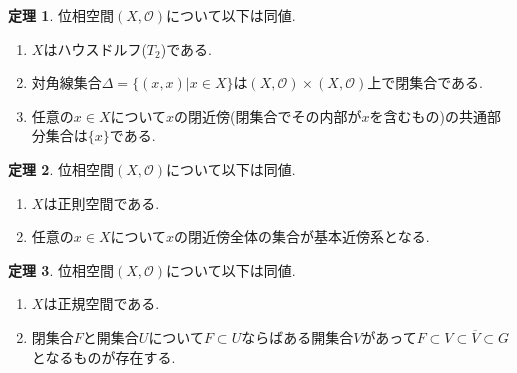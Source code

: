 \documentclass[dvipdfmx,a4paper,11pt]{article}
\theoremstyle{definition}
\newtheorem{thm}{定理}
\begin{document}
    \begin{tcolorbox}[
    colback = white,
    colframe = green!35!black,
    fonttitle = \bfseries,
    breakable = true]
    \begin{thm}
    位相空間$(X, \mathscr{O})$について以下は同値.
    \begin{enumerate}
     \setlength{\parskip}{0cm} 
  \setlength{\itemsep}{0cm} 
    \item $X$はハウスドルフ($T_2$)である.
    \item 対角線集合$\Delta = \{ (x,x) | x \in X\}$は$(X, \mathscr{O}) \times (X, \mathscr{O})$上で閉集合である.
    \item 任意の$x \in X$について$x$の閉近傍(閉集合でその内部が$x$を含むもの)の共通部分集合は$\{ x\}$である.
    \end{enumerate}
  \end{thm}
 \end{tcolorbox}

  \begin{tcolorbox}[
    colback = white,
    colframe = green!35!black,
    fonttitle = \bfseries,
    breakable = true]
    \begin{thm}
    位相空間$(X, \mathscr{O})$について以下は同値.
    \begin{enumerate}
     \setlength{\parskip}{0cm} 
  \setlength{\itemsep}{0cm} 
    \item $X$は正則空間である.
    \item 任意の$x \in X$について$x$の閉近傍全体の集合が基本近傍系となる.
    \end{enumerate}
  \end{thm}
 \end{tcolorbox}

 \begin{tcolorbox}[
    colback = white,
    colframe = green!35!black,
    fonttitle = \bfseries,
    breakable = true]
    \begin{thm}
    位相空間$(X, \mathscr{O})$について以下は同値.
    \begin{enumerate}
     \setlength{\parskip}{0cm} 
  \setlength{\itemsep}{0cm} 
    \item $X$は正規空間である.
    \item 閉集合$F$と開集合$U$について$F \subset U$ならばある開集合$V$があって$F \subset V \subset \overline{V} \subset G$となるものが存在する.
    \end{enumerate}
  \end{thm}
 \end{tcolorbox}
 
\end{document}
